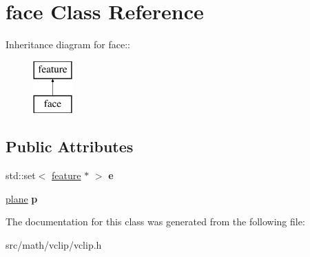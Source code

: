 \hypertarget{classface}{
\section{face Class Reference}
\label{classface}
}
Inheritance diagram for face::\begin{figure}[H]
\begin{center}
\leavevmode
\includegraphics[height=2cm]{classface}
\end{center}
\end{figure}
\subsection*{Public Attributes}
\begin{DoxyCompactItemize}
\item 
\hypertarget{classface_a11e8c57124ede77de5842c52e10472c8}{
std::set$<$ \hyperlink{classfeature}{feature} $\ast$ $>$ {\bfseries e}}
\label{classface_a11e8c57124ede77de5842c52e10472c8}

\item 
\hypertarget{classface_ae494cf85c810c1014bf424e7a39eeaee}{
\hyperlink{classplane}{plane} {\bfseries p}}
\label{classface_ae494cf85c810c1014bf424e7a39eeaee}

\end{DoxyCompactItemize}


The documentation for this class was generated from the following file:\begin{DoxyCompactItemize}
\item 
src/math/vclip/vclip.h\end{DoxyCompactItemize}
